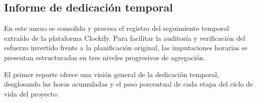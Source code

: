 \begin{appendices}
\chapter{Informe de dedicación temporal}\label{anexo:clockify}

En este anexo se consolida y procesa el registro del seguimiento temporal extraído de la plataforma Clockify. Para facilitar la auditoría y verificación del esfuerzo invertido frente a la planificación original, las imputaciones horarias se presentan estructuradas en tres niveles progresivos de agregación.

El primer reporte ofrece una visión general de la dedicación temporal, desglosando las horas acumuladas y el peso porcentual de cada etapa del ciclo de vida del proyecto:

\begin{table}[H]
  \centering
  \renewcommand{\arraystretch}{1.5}
  \caption{Distribución global del tiempo invertido por fases del proyecto.}
  \label{tab:resumen_fases}
\end{table}


\end{appendices}
